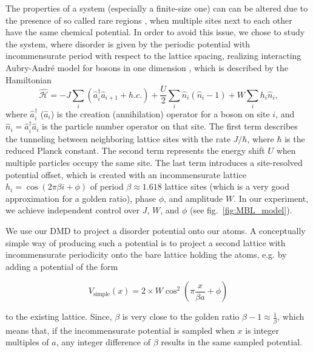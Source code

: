 The properties of a system (especially a finite-size one) can can be altered due to the presence of so called rare regions \cite{Agarwal2015, Agarwal2017, Roeck2017, Luitz2017, Nandkishore2017}, when multiple sites next to each other have the same chemical potential. In order to avoid this issue, we chose to study the system, where disorder is given by the periodic potential with incommensurate period with respect to the lattice spacing, realizing interacting Aubry-Andr\'e model for bosons in one dimension \cite{Aubry1980, Iyer2013}, which is described by the Hamiltonian
\begin{equation}
\hat{\mathcal{H}} =  -J \sum_i \left(\hat{a}_i^\dagger\hat{a}_{i+1} + h.c.\right) 
+ \frac{U}{2} \sum_i\hat{n}_i \left( \hat{n}_i - 1\right) + W\sum_i h_i\hat{n}_i\text{,}
\end{equation}
where $\hat{a}_i^\dagger$ ($\hat{a}_i$) is the creation (annihilation) operator for a boson on site $i$, and $\hat{n}_i = \hat{a}_i^\dagger\hat{a}_i$ is the particle number operator on that site. The first term describes the tunneling between neighboring lattice sites with the rate $J/\hbar$, where $\hbar$ is the reduced Planck constant. The second term represents the energy shift $U$ when multiple particles occupy the same site. The last term introduces a site-resolved potential offset, which is created with an incommensurate lattice $h_i = \cos\left(2\pi\beta i+\phi\right)$ of period $\beta\approx 1.618$ lattice sites (which is a very good approximation for a golden ratio), phase $\phi$, and amplitude $W$. In our experiment, we achieve independent control over $J$, $W$, and $\phi$ (see fig.~\ref{fig:MBL_model}).

We use our DMD to project a disorder potential onto our atoms. A conceptually simple way of producing such a potential is to project a second lattice with incommensurate periodicity onto the bare lattice holding the atoms, e.g. by adding a potential of the form

\begin{equation}\label{eqn:Vsimple}
V_\text{simple}(x) = 2 \times W \cos^2\left(\pi\frac{x}{\beta a}+\phi\right)
\end{equation}

to the existing lattice. Since, $\beta$ is very close to the golden ratio $\beta-1 \approx \frac{1}{\beta}$, which means that, if the incommensurate potential is sampled when $x$ is integer multiples of $a$, any integer difference of $\beta$ results in the same sampled potential. 

